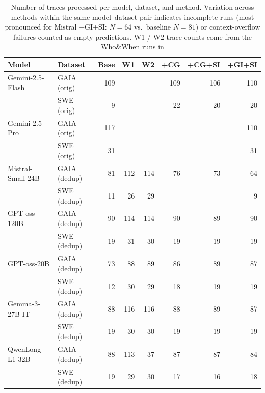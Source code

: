 \begin{table}[t]
\centering
\small
\setlength{\tabcolsep}{5pt}
\renewcommand{\arraystretch}{1.1}
\begin{tabular}{ll rrrrrr}
\toprule
\textbf{Model} & \textbf{Dataset} & \textbf{Base} & \textbf{W1} & \textbf{W2} & \textbf{+CG} & \textbf{+CG+SI} & \textbf{+GI+SI} \\
\midrule
Gemini-2.5-Flash      & GAIA (orig)    & 109 & \text{---} & \text{---} & 109 & 106 & 110 \\
                      & SWE  (orig)    &   9 & \text{---} & \text{---} &  22 &  20 &  20 \\
\midrule
Gemini-2.5-Pro        & GAIA (orig)    & 117 & \text{---} & \text{---} & \text{---} & \text{---} & 110 \\
                      & SWE  (orig)    &  31 & \text{---} & \text{---} & \text{---} & \text{---} &  31 \\
\midrule
Mistral-Small-24B     & GAIA (dedup)   &  81 & 112 & 114 &  76 &  73 &  64 \\
                      & SWE  (dedup)   &  11 &  26 &  29 & \text{---} & \text{---} &   9 \\
\midrule
GPT-oss-120B          & GAIA (dedup)   &  90 & 114 & 114 &  90 &  89 &  90 \\
                      & SWE  (dedup)   &  19 &  31 &  30 &  19 &  19 &  19 \\
\midrule
GPT-oss-20B           & GAIA (dedup)   &  73 &  88 &  89 &  86 &  89 &  87 \\
                      & SWE  (dedup)   &  12 &  30 &  29 &  18 &  19 &  19 \\
\midrule
Gemma-3-27B-IT        & GAIA (dedup)   &  88 & 116 & 116 &  88 &  89 &  87 \\
                      & SWE  (dedup)   &  19 &  30 &  30 &  19 &  19 &  19 \\
\midrule
QwenLong-L1-32B       & GAIA (dedup)   &  88 & 113 &  37 &  87 &  87 &  84 \\
                      & SWE  (dedup)   &  19 &  29 &  30 &  17 &  16 &  18 \\
\bottomrule
\end{tabular}
\caption{%
  Number of traces processed per model, dataset, and method.
  Variation across methods within the same model--dataset pair indicates
  incomplete runs (most pronounced for Mistral +GI+SI: $N{=}64$ vs.\
  baseline $N{=}81$) or context-overflow failures counted as empty
  predictions.
  W1 / W2 trace counts come from the Who\&When runs in
}
\end{table}
